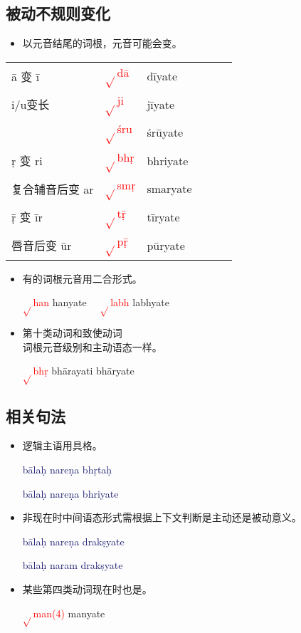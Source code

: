 \documentclass[17pt]{beamer}
\newcommand{\verbroot}[1]{\textcolor{red}{$\sqrt{}$#1}}
\newcommand{\fullpada}[1]{\textcolor{OliveGreen}{#1}}
\newcommand{\fullsentence}[1]{\textcolor{MidnightBlue}{#1}}
\begin{document}
\subsection{被动不规则变化}
\begin{frame}{\insertsubsection }
  \begin{itemize}
    \item
      以元音结尾的词根，元音可能会变。
  \end{itemize}
  \centering
  \begin{tabular}{@{}llllll@{}} %
      ā 变 ī & \verbroot{dā}  & \fullpada{dīyate}   \\
      i/u变长 &\verbroot{ji} & \fullpada{jīyate} \\
      & \verbroot{śru} & \fullpada{śrūyate} \\
      ṛ 变 ri &\verbroot{bhṛ} & \fullpada{bhriyate}  \\
      复合辅音后变 ar &\verbroot{smṛ} & \fullpada{smaryate}  \\
      ṝ 变 īr &\verbroot{tṝ} & \fullpada{tīryate}  \\
      唇音后变 ūr &\verbroot{pṝ} & \fullpada{pūryate}  \\
    \end{tabular}
\end{frame}

\begin{frame}{\insertsubsection }
  \begin{itemize}
    \item  有的词根元音用二合形式。

    \verbroot{han} \fullpada{hanyate} ~~\verbroot{labh} \fullpada{labhyate}
    \item 第十类动词和致使动词\\词根元音级别和主动语态一样。 
    
    \verbroot{bhṛ} \fullpada{bhārayati} \fullpada{bhāryate}
  \end{itemize}
\end{frame}

\subsection{相关句法}
\begin{frame}{\insertsubsection }
  \begin{itemize}
    \item  逻辑主语用具格。

    \fullsentence{bālaḥ nareṇa bhṛtaḥ}

    \fullsentence{bālaḥ nareṇa bhriyate}
    \item 非现在时中间语态形式需根据上下文判断是主动还是被动意义。 
    
    \fullsentence{bālaḥ nareṇa drakṣyate} 

    \fullsentence{bālaḥ naram drakṣyate}
    \item 某些第四类动词现在时也是。
    
    \verbroot{man(4)} \fullpada{manyate}
  \end{itemize}
\end{frame}
\end{document}

